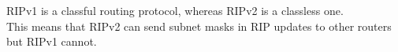 RIPv1 is a classful routing protocol, whereas RIPv2 is a classless one. \\
This means that RIPv2 can send subnet masks in RIP updates to other routers but RIPv1 cannot.
